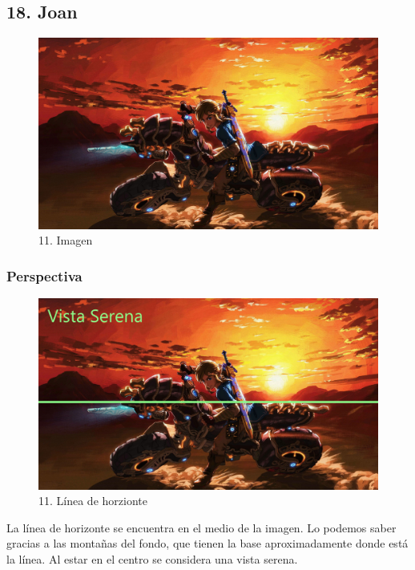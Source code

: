 \documentclass[12pt]{article}
\begin{document}
    \subsection{18. Joan}
        \begin{figure}[H]
          \centering
          \includegraphics[width=\textwidth]{images/Concepts/18_concept_art.jpg}
          \caption{\small 11. Imagen}
        \end{figure}

            \subsubsection{Perspectiva}
            \begin{figure}[H]
          \centering
          \includegraphics[width=\textwidth]{images/Joan/Sección 17/Imagen 18_Línea Horizonte.jpg}
          \caption{\small 11. Línea de horzionte}
        \end{figure}
        La línea de horizonte se encuentra en el medio de la imagen. Lo podemos saber gracias a las montañas del fondo, que tienen la base aproximadamente donde está la línea. 
    Al estar en el centro se considera una vista serena. 
\end{document}
